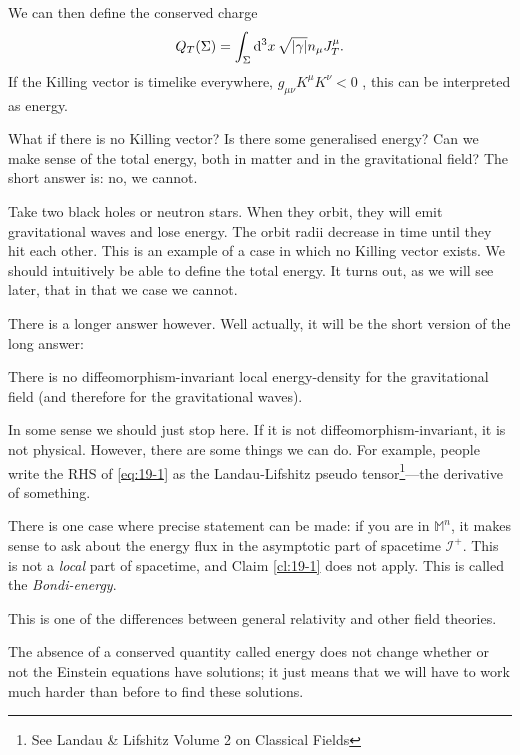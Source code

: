 We can then define the conserved charge
\begin{equation}
  Q_T(\Sigma) = \int_{\Sigma} \dd[3]{x} \sqrt{\abs{\gamma}} n_{\mu} J^{\mu}_T.
\end{equation}
If the Killing vector is timelike everywhere, $g_{\mu\nu} K^{\mu} K^{\nu} < 0$ , this can be interpreted as energy.

What if there is no Killing vector? Is there some generalised energy? Can we make sense of the total energy, both in matter and in the gravitational field?
The short answer is: no, we cannot.
\begin{example}[]
  Take two black holes or neutron stars. When they orbit, they will emit gravitational waves and lose energy. The orbit radii decrease in time until they hit each other. This is an example of a case in which no Killing vector exists. We should intuitively be able to define the total energy.
  It turns out, as we will see later, that in that we case we cannot.
\end{example}

There is a longer answer however. Well actually, it will be the short version of the long answer:
\begin{claim}
  \label{cl:19-1}
  There is no diffeomorphism-invariant local energy-density for the gravitational field (and therefore for the gravitational waves).
\end{claim}

In some sense we should just stop here. If it is not diffeomorphism-invariant, it is not physical.
However, there are some things we can do. For example, people write the RHS of \eqref{eq:19-1} as the Landau-Lifshitz pseudo tensor\footnote{See Landau \& Lifshitz Volume 2 on Classical Fields}---the derivative of something.

There is one case where precise statement can be made: if you are in $\mathbb{M}^n$, it makes sense to ask about the energy flux in the asymptotic part of spacetime $\mathscr{I}^+$. This is not a \emph{local} part of spacetime, and Claim \ref{cl:19-1} does not apply.
This is called the \emph{Bondi-energy}.

This is one of the differences between general relativity and other field theories.

\begin{leftbar}
  \begin{note}
    The absence of a conserved quantity called energy does not change whether or not the Einstein equations have solutions; it just means that we will have to work much harder than before to find these solutions.
  \end{note}
\end{leftbar}

